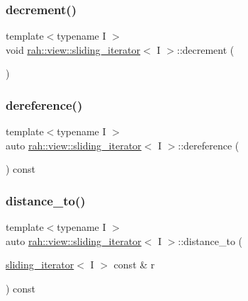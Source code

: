 \subsubsection{\texorpdfstring{decrement()}{decrement()}}
{\footnotesize\ttfamily template$<$typename I $>$ \\
void \mbox{\hyperlink{structrah_1_1view_1_1sliding__iterator}{rah\+::view\+::sliding\+\_\+iterator}}$<$ I $>$\+::decrement (\begin{DoxyParamCaption}{ }\end{DoxyParamCaption})\hspace{0.3cm}{\ttfamily [inline]}}

\mbox{\label{structrah_1_1view_1_1sliding__iterator_a1a3c2cc7b17879f3745797de3b933ed4}} 
\subsubsection{\texorpdfstring{dereference()}{dereference()}}
{\footnotesize\ttfamily template$<$typename I $>$ \\
auto \mbox{\hyperlink{structrah_1_1view_1_1sliding__iterator}{rah\+::view\+::sliding\+\_\+iterator}}$<$ I $>$\+::dereference (\begin{DoxyParamCaption}{ }\end{DoxyParamCaption}) const\hspace{0.3cm}{\ttfamily [inline]}}

\mbox{\label{structrah_1_1view_1_1sliding__iterator_a39b05ab81dcf63fcad30effc793b42dd}} 
\subsubsection{\texorpdfstring{distance\_to()}{distance\_to()}}
{\footnotesize\ttfamily template$<$typename I $>$ \\
auto \mbox{\hyperlink{structrah_1_1view_1_1sliding__iterator}{rah\+::view\+::sliding\+\_\+iterator}}$<$ I $>$\+::distance\+\_\+to (\begin{DoxyParamCaption}\item[{\mbox{\hyperlink{structrah_1_1view_1_1sliding__iterator}{sliding\+\_\+iterator}}$<$ I $>$ const \&}]{r }\end{DoxyParamCaption}) const\hspace{0.3cm}{\ttfamily [inline]}}

